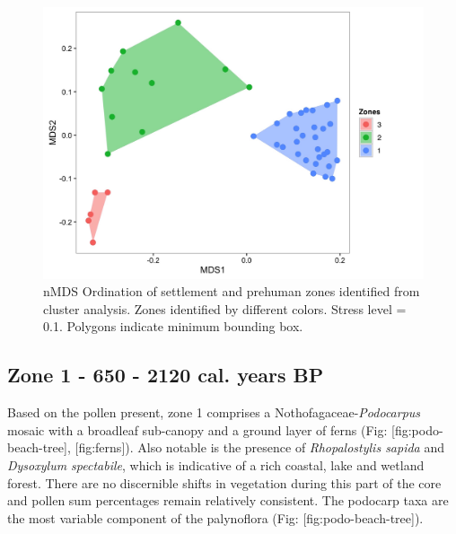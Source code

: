 \begin{figure}
\centering
\includegraphics{Figs/nmds-analysis.jpeg}
\caption{nMDS Ordination of settlement and prehuman zones identified
from cluster analysis. Zones identified by different colors. Stress
level = 0.1. Polygons indicate minimum bounding box.{}}
\end{figure}

\subsection{Zone 1 - 650 - 2120 cal. years
BP}\label{zone-1---650---2120-cal.-years-bp}

Based on the pollen present, zone 1 comprises a
Nothofagaceae-\emph{Podocarpus} mosaic with a broadleaf sub-canopy and a
ground layer of ferns (Fig: {[}fig:podo-beach-tree{]}, {[}fig:ferns{]}).
Also notable is the presence of \emph{Rhopalostylis sapida} and
\emph{Dysoxylum spectabile}, which is indicative of a rich coastal, lake
and wetland forest. There are no discernible shifts in vegetation during
this part of the core and pollen sum percentages remain relatively
consistent. The podocarp taxa are the most variable component of the
palynoflora (Fig: {[}fig:podo-beach-tree{]}).

